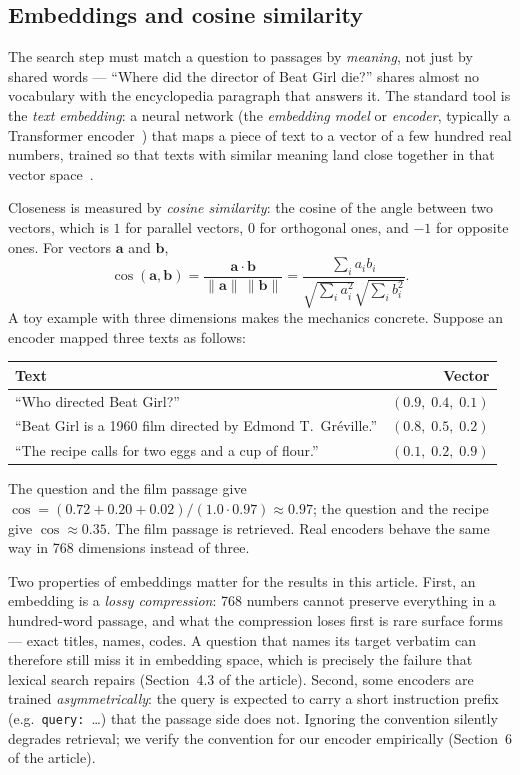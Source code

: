 \subsection{Embeddings and cosine similarity}
\label{sec:embeddings}

The search step must match a question to passages by \emph{meaning}, not
just by shared words --- ``Where did the director of Beat Girl die?'' shares
almost no vocabulary with the encyclopedia paragraph that answers it. The
standard tool is the \emph{text embedding}: a neural network (the
\emph{embedding model} or \emph{encoder}, typically a Transformer
encoder~\citep{vaswani2017attention,devlin2019bert}) that maps a piece of
text to a vector of a few hundred real numbers, trained so that texts
with similar meaning land close together in that vector
space~\citep{reimers2019sbert}.

Closeness is measured by \emph{cosine similarity}: the cosine of the angle
between two vectors, which is $1$ for parallel vectors, $0$ for orthogonal
ones, and $-1$ for opposite ones. For vectors $\mathbf{a}$ and $\mathbf{b}$,
\begin{equation}
\cos(\mathbf{a},\mathbf{b})
  = \frac{\mathbf{a}\cdot\mathbf{b}}{\lVert\mathbf{a}\rVert\,\lVert\mathbf{b}\rVert}
  = \frac{\sum_i a_i b_i}{\sqrt{\sum_i a_i^2}\sqrt{\sum_i b_i^2}}.
\end{equation}
A toy example with three dimensions makes the mechanics concrete. Suppose an
encoder mapped three texts as follows:
\begin{center}
\small
\begin{tabular}{lr}
\toprule
Text & Vector \\
\midrule
``Who directed Beat Girl?'' & $(0.9,\; 0.4,\; 0.1)$ \\
``Beat Girl is a 1960 film directed by Edmond T.\ Gr\'eville.'' & $(0.8,\; 0.5,\; 0.2)$ \\
``The recipe calls for two eggs and a cup of flour.'' & $(0.1,\; 0.2,\; 0.9)$ \\
\bottomrule
\end{tabular}
\end{center}
The question and the film passage give
$\cos = (0.72+0.20+0.02)/(1.0\cdot0.97) \approx 0.97$; the question and the
recipe give $\cos \approx 0.35$. The film passage is retrieved. Real
encoders behave the same way in 768 dimensions instead of three.

Two properties of embeddings matter for the results in this article. First,
an embedding is a \emph{lossy compression}: 768 numbers cannot preserve
everything in a hundred-word passage, and what the compression loses first
is rare surface forms --- exact titles, names, codes. A question that names
its target verbatim can therefore still miss it in embedding space, which
is precisely the failure that lexical search repairs
(Section~4.3 of the article). Second, some encoders are trained
\emph{asymmetrically}: the query is expected to carry a short instruction
prefix (e.g.\ \texttt{query:}~\ldots) that the passage side does not.
Ignoring the convention silently degrades retrieval; we verify the
convention for our encoder empirically (Section~6 of the article).

